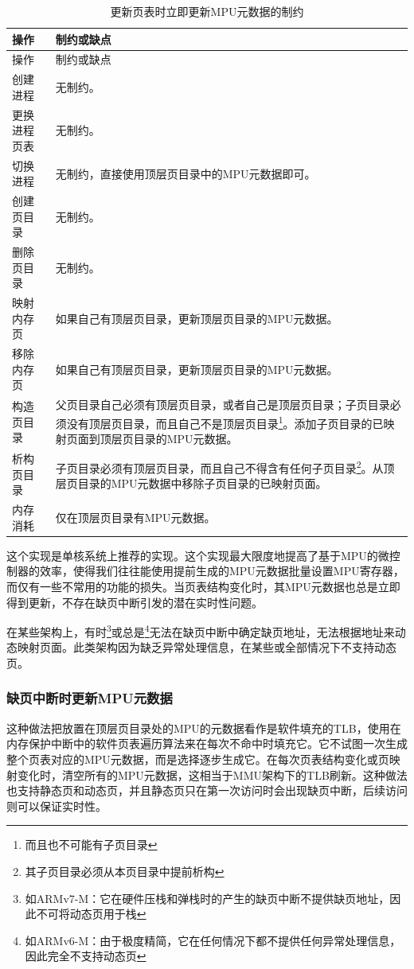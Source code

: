 \begin{xltabular}{\textwidth}{@{}>{\hsize\raggedright\arraybackslash}X>{\hsize\raggedright\arraybackslash}X@{}}
\caption{更新页表时立即更新MPU元数据的制约}\label{tab:3-6-immediate-mpu-metadata-update-constraints}\\
\toprule
操作 & 制约或缺点\tabularnewline
\endfirsthead
\toprule
操作 & 制约或缺点\tabularnewline
\midrule
\endhead
\bottomrule
\endlastfoot
创建进程 & 无制约。\tabularnewline
更换进程页表 & 无制约。\tabularnewline
切换进程 & 无制约，直接使用顶层页目录中的MPU元数据即可。\tabularnewline
创建页目录 & 无制约。\tabularnewline
删除页目录 & 无制约。\tabularnewline
映射内存页 &
如果自己有顶层页目录，更新顶层页目录的MPU元数据。\tabularnewline
移除内存页 &
如果自己有顶层页目录，更新顶层页目录的MPU元数据。\tabularnewline
构造页目录 &
父页目录自己必须有顶层页目录，或者自己是顶层页目录；子页目录必须没有顶层页目录，而且自己不是顶层页目录\footnote{而且也不可能有子页目录}。添加子页目录的已映射页面到顶层页目录的MPU元数据。\tabularnewline
析构页目录 &
子页目录必须有顶层页目录，而且自己不得含有任何子页目录\footnote{其子页目录必须从本页目录中提前析构}。从顶层页目录的MPU元数据中移除子页目录的已映射页面。\tabularnewline
内存消耗 & 仅在顶层页目录有MPU元数据。\tabularnewline
\end{xltabular}

这个实现是单核系统上推荐的实现。这个实现最大限度地提高了基于MPU的微控制器的效率，使得我们往往能使用提前生成的MPU元数据批量设置MPU寄存器，而仅有一些不常用的功能的损失。当页表结构变化时，其MPU元数据也总是立即得到更新，不存在缺页中断引发的潜在实时性问题。

在某些架构上，有时\footnote{如ARMv7-M：它在硬件压栈和弹栈时的产生的缺页中断不提供缺页地址，因此不可将动态页用于栈}或总是\footnote{如ARMv6-M：由于极度精简，它在任何情况下都不提供任何异常处理信息，因此完全不支持动态页}无法在缺页中断中确定缺页地址，无法根据地址来动态映射页面。此类架构因为缺乏异常处理信息，在某些或全部情况下不支持动态页。

\subsubsection{缺页中断时更新MPU元数据}\label{subsubsec:3-update-mpu-metadata-on-page-fault}

这种做法把放置在顶层页目录处的MPU的元数据看作是软件填充的TLB，使用在内存保护中断中的软件页表遍历算法来在每次不命中时填充它。它不试图一次生成整个页表对应的MPU元数据，而是选择逐步生成它。在每次页表结构变化或页映射变化时，清空所有的MPU元数据，这相当于MMU架构下的TLB刷新。这种做法也支持静态页和动态页，并且静态页只在第一次访问时会出现缺页中断，后续访问则可以保证实时性。

